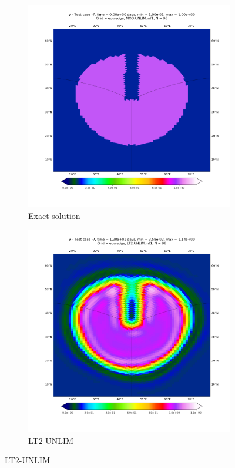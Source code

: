 \documentclass[preprint,12pt]{elsarticle}
\begin{document}
\begin{linenumbers}
\begin{figure}[!htb]
	\centering
	\begin{subfigure}{0.45\textwidth}
		\centering
		\includegraphics[width=1.1\linewidth]{h_tc-7_t0_alpha45_C96_g0_dg2_adv2_hord0_mf1_tf12}
		\caption{Exact solution\label{CY-IC}}
	\end{subfigure}
	\begin{subfigure}{0.45\textwidth}
		\centering
		\includegraphics[width=1.1\linewidth]{h_tc-7_t12_alpha45_C96_g0_dg2_adv2_hord0_mf1_tf12}
		\caption{LT2-UNLIM\label{CY-LT2-UNLIM-corner}}
	\end{subfigure}
	

\end{figure}
\end{linenumbers}
\end{document}
